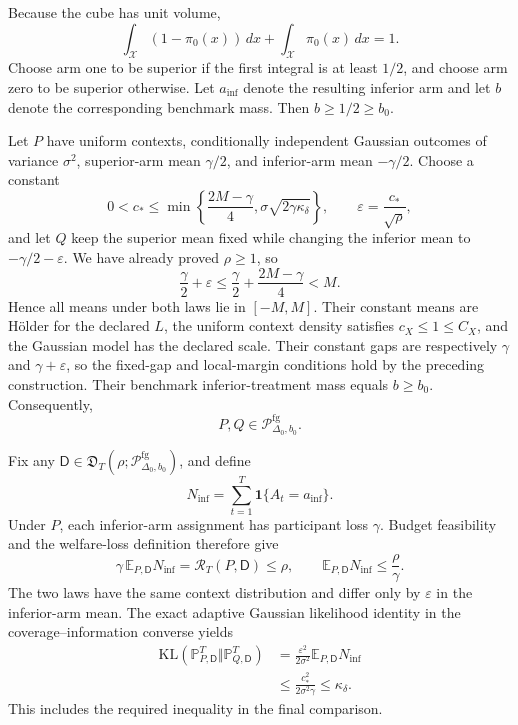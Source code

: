 Because the cube has unit volume,
\[
 \int_{\mathcal X}(1-\pi_0(x))\,dx+
 \int_{\mathcal X}\pi_0(x)\,dx=1.
\]
Choose arm one to be superior if the first integral is at least \(1/2\), and
choose arm zero to be superior otherwise.  Let \(a_{\mathrm{inf}}\) denote
the resulting inferior arm and let \(b\) denote the corresponding benchmark
mass.  Then \(b\geq1/2\geq b_0\).

Let \(P\) have uniform contexts, conditionally independent Gaussian outcomes
of variance \(\sigma^2\), superior-arm mean \(\gamma/2\), and inferior-arm
mean \(-\gamma/2\).  Choose a constant
\[
 0<c_*\leq\min\left\{\frac{2M-\gamma}{4},
 \sigma\sqrt{2\gamma\kappa_\delta}\right\},
 \qquad
 \varepsilon=\frac{c_*}{\sqrt\rho},
\]
and let \(Q\) keep the superior mean fixed while changing the inferior mean
to \(-\gamma/2-\varepsilon\).  We have already proved \(\rho\geq1\), so
\[
 \frac\gamma2+\varepsilon
 \leq\frac\gamma2+\frac{2M-\gamma}{4}<M.
\]
Hence all means under both laws lie in \([-M,M]\).  Their constant means are
H\"older for the declared \(L\), the uniform context density satisfies
\(c_X\leq1\leq C_X\), and the Gaussian model has the declared scale.  Their
constant gaps are respectively \(\gamma\) and \(\gamma+\varepsilon\), so the
fixed-gap and local-margin conditions hold by the preceding construction.
Their benchmark inferior-treatment mass equals \(b\geq b_0\).  Consequently,
\[
 P,Q\in\mathcal P_{\Delta_0,b_0}^{\mathrm{fg}}.
\]

Fix any
\(\mathsf D\in\mathfrak D_T(\rho;
\mathcal P_{\Delta_0,b_0}^{\mathrm{fg}})\), and define
\[
 N_{\mathrm{inf}}=\sum_{t=1}^T\mathbf1\{A_t=a_{\mathrm{inf}}\}.
\]
Under \(P\), each inferior-arm assignment has participant loss \(\gamma\).
Budget feasibility and the welfare-loss definition therefore give
\[
 \gamma\,\mathbb E_{P,\mathsf D}N_{\mathrm{inf}}
 =\mathcal R_T(P,\mathsf D)\leq\rho,
 \qquad
 \mathbb E_{P,\mathsf D}N_{\mathrm{inf}}\leq\frac\rho\gamma.
\]
The two laws have the same context distribution and differ only by
\(\varepsilon\) in the inferior-arm mean.  The exact adaptive Gaussian
likelihood identity in the coverage--information converse yields
\[
 \begin{aligned}
 \mathrm{KL}(\mathbb P_{P,\mathsf D}^{T}
             \Vert\mathbb P_{Q,\mathsf D}^{T})
 &=\frac{\varepsilon^2}{2\sigma^2}
   \mathbb E_{P,\mathsf D}N_{\mathrm{inf}}\\
 &\leq\frac{c_*^2}{2\sigma^2\gamma}
 \leq\kappa_\delta.
 \end{aligned}
\]
This includes the required inequality in the final comparison.

